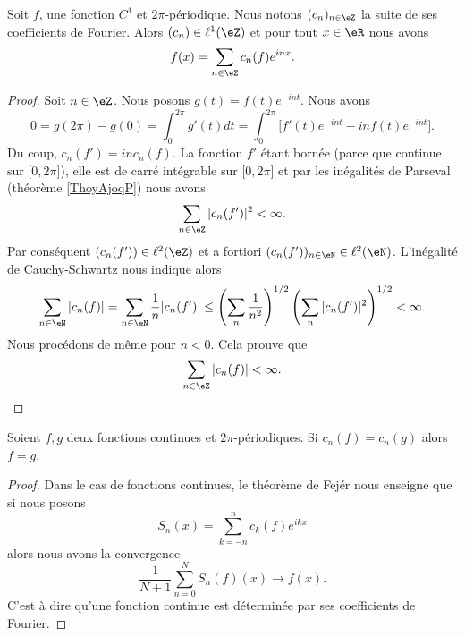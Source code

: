 \begin{theorem}     \label{ThozHXraQ}
    Soit \( f\), une fonction \( C^1\) et \( 2\pi\)-périodique. Nous notons \( (c_n)_{n\in \eZ}\) la suite de ses coefficients de Fourier. Alors \( (c_n)\in \ell^1(\eZ)\) et pour tout \( x\in \eR\) nous avons
    \begin{equation}
        f(x)=\sum_{n\in \eZ}c_n(f) e^{inx}.
    \end{equation}
\end{theorem}

\begin{proof}
    Soit \( n\in \eZ\). Nous posons \( g(t)=f(t) e^{-int}\). Nous avons
    \begin{equation}
        0=g(2\pi)-g(0)=\int_0^{2\pi}g'(t)dt=\int_0^{2\pi}\big[ f'(t) e^{-int}-inf(t) e^{-int} \big].
    \end{equation}
    Du coup, \( c_n(f')=inc_n(f)\). La fonction \( f'\) étant bornée (parce que continue sur \( \mathopen[ 0 , 2\pi \mathclose]\)), elle est de carré intégrable sur \( \mathopen[ 0 , 2\pi \mathclose]\) et par les inégalités de Parseval (théorème \ref{ThoyAjoqP}) nous avons
    \begin{equation}
        \sum_{n\in \eZ}| c_n(f') |^2<\infty.
    \end{equation}
    Par conséquent \( (c_n(f'))\in \ell^2(\eZ)\) et a fortiori \( (c_n(f'))_{n\in \eN}\in \ell^2(\eN)\). L'inégalité de Cauchy-Schwartz nous indique alors
    \begin{equation}
        \sum_{n\in \eN}| c_n(f) |=\sum_{n\in \eN}\frac{1}{ n }| c_n(f') |\leq \left( \sum_n\frac{1}{ n^2 } \right)^{1/2}\left( \sum_{n}| c_n(f') |^2 \right)^{1/2}<\infty.
    \end{equation}
    Nous procédons de même pour \( n<0\). Cela prouve que 
    \begin{equation}
        \sum_{n\in \eZ}| c_n(f) |<\infty.
    \end{equation}
\end{proof}

\begin{corollary}   \label{CordgtXlC}
    Soient \( f,g\) deux fonctions continues et \( 2\pi\)-périodiques. Si \( c_n(f)=c_n(g)\) alors \( f=g\).
\end{corollary}

\begin{proof}
    Dans le cas de fonctions continues, le théorème de Fejér nous enseigne que si nous posons 
    \begin{equation}
        S_n(x)=\sum_{k=-n}^{n}c_k(f) e^{ikx}
    \end{equation}
    alors nous avons la convergence
    \begin{equation}
        \frac{1}{ N+1 }\sum_{n=0}^NS_n(f)(x)\to f(x).
    \end{equation}
    C'est à dire qu'une fonction continue est déterminée par ses coefficients de Fourier.
\end{proof}

